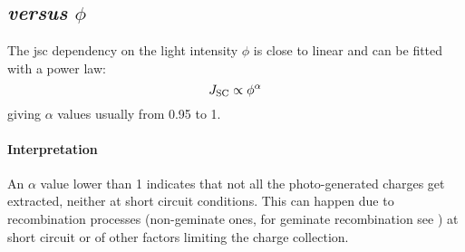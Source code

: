 	\subsection{ \textit{versus} $\phi$}\label{jsc-phi}
		The \gls{jsc} dependency on the light intensity $\phi$ is close to linear and can be fitted with a power law:
		\begin{equation} \label{eq:jsc-phi}
			J_\mathrm{SC} \propto \phi^\alpha
		\end{equation}
		giving $\alpha$ values usually from 0.95 to 1.

		\paragraph{Interpretation} 
		An $\alpha$ value lower than 1 indicates that not all the photo-generated charges get extracted, neither at short circuit conditions.
		This can happen due to recombination processes (non-geminate ones, for geminate recombination see ) at short circuit \cite{Credgington2011} or of other factors limiting the charge collection. 

